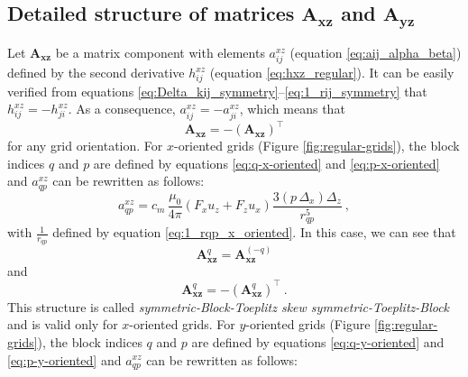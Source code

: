 \documentclass[manuscript]{geophysics}
\providecommand{\DIFaddtex}[1]{{\protect\color{blue}\uwave{#1}}} %
\providecommand{\DIFaddbegin}{} %
\providecommand{\DIFaddend}{} %
\providecommand{\DIFadd}[1]{\texorpdfstring{\DIFaddtex{#1}}{#1}} %
\begin{document}
	\subsection{Detailed structure of matrices $\mathbf{A_{xz}}$ and $\mathbf{A_{yz}}$}
	
	Let $\mathbf{A}_{\boldsymbol{xz}}$ be a matrix component with elements
	$a^{xz}_{ij}$ (equation \ref{eq:aij_alpha_beta}) defined by the second derivative \DIFaddbegin \DIFadd{calculated in
	}\DIFaddend $h^{xz}_{ij}$ (equation \ref{eq:hxz_regular}). It can be easily verified from equations
	\ref{eq:Delta_kij_symmetry}--\ref{eq:1_rij_symmetry} that $h^{xz}_{ij} = -h^{xz}_{ji}$.
	As a consequence, $a^{xz}_{ij} = -a^{xz}_{ji}$, which means that 
	\begin{equation}
		\mathbf{A}_{\boldsymbol{xz}} = -\left( \mathbf{A}_{\boldsymbol{xz}} \right)^{\top}
		\label{eq:Axz_symmetry}
	\end{equation} 
	for any grid orientation.
	For $x$-oriented grids (Figure \ref{fig:regular-grids}), the block indices $q$ and $p$ are defined 
	by equations \ref{eq:q-x-oriented} and 
	\ref{eq:p-x-oriented} and $a^{xz}_{qp}$ can be rewritten as follows:
	\begin{equation}
		a^{xz}_{qp} = c_{m} \, \frac{\mu_{0}}{4\pi} 
		\left( F_{x} u_{z} + F_{z} u_{x} \right) \frac{3 \left( p \, \Delta_{x} \right) \Delta_{z}}{r_{qp}^{5}}
		\: ,
		\label{eq:aqp_xz_x_oriented}
	\end{equation}
	with $\tfrac{1}{r_{qp}}$ defined by equation \ref{eq:1_rqp_x_oriented}.
	In this case, we can see that
	\begin{equation}
		\mathbf{A}_{\boldsymbol{xz}}^{q} = \mathbf{A}_{\boldsymbol{xz}}^{(-q)}
		\label{eq:Axz_q_external_block_symmetry_x_oriented}
	\end{equation}
	and 
	\begin{equation}
		\mathbf{A}_{\boldsymbol{xz}}^{q} = -\left( \mathbf{A}_{\boldsymbol{xz}}^{q} \right)^{\top} \: .
		\label{eq:Axz_q_internal_block_symmetry_x_oriented}
	\end{equation}
	This structure is called \textit{symmetric-Block-Toeplitz skew symmetric-Toeplitz-Block} and is 
	valid only for $x$-oriented grids.
	For $y$-oriented grids (Figure \ref{fig:regular-grids}), the block indices $q$ and $p$ are 
	defined by equations \ref{eq:q-y-oriented} and 
	\ref{eq:p-y-oriented} and $a^{xz}_{qp}$ can be rewritten as follows:
\end{document}
